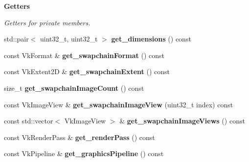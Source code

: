 \begin{Indent}\textbf{ Getters}\par
{\em Getters for private members. }\begin{DoxyCompactItemize}
\item 
\mbox{\label{classblaze_1_1ForwardRenderer_a871a10ee38277a2cb2c0ef9e3d65712f}} 
std\+::pair$<$ uint32\+\_\+t, uint32\+\_\+t $>$ {\bfseries get\+\_\+dimensions} () const
\item 
\mbox{\label{classblaze_1_1ForwardRenderer_ab0c14f3daed7186b1e726f7efd122e7d}} 
const Vk\+Format \& {\bfseries get\+\_\+swapchain\+Format} () const
\item 
\mbox{\label{classblaze_1_1ForwardRenderer_ae4a6f9234ad9454acd3edafec772480e}} 
const Vk\+Extent2D \& {\bfseries get\+\_\+swapchain\+Extent} () const
\item 
\mbox{\label{classblaze_1_1ForwardRenderer_afb27e80c004057dc8aec9652d160e53b}} 
size\+\_\+t {\bfseries get\+\_\+swapchain\+Image\+Count} () const
\item 
\mbox{\label{classblaze_1_1ForwardRenderer_aa442b4f23e7db5f9650802a56bfc37f5}} 
const Vk\+Image\+View \& {\bfseries get\+\_\+swapchain\+Image\+View} (uint32\+\_\+t index) const
\item 
\mbox{\label{classblaze_1_1ForwardRenderer_a3f103d7524870ec1bc7b8a1a9ee9d85f}} 
const std\+::vector$<$ Vk\+Image\+View $>$ \& {\bfseries get\+\_\+swapchain\+Image\+Views} () const
\item 
\mbox{\label{classblaze_1_1ForwardRenderer_ae50e653d1321151a9f9c9809d660958c}} 
const Vk\+Render\+Pass \& {\bfseries get\+\_\+render\+Pass} () const
\item 
\mbox{\label{classblaze_1_1ForwardRenderer_afb5a01c431387ae87f2b69f1a95faa0a}} 
const Vk\+Pipeline \& {\bfseries get\+\_\+graphics\+Pipeline} () const
\item 
\mbox{\label{classblaze_1_1ForwardRenderer_aa13a6c13d0688cafd96aecf19dce466c}} 

\end{DoxyCompactItemize}
\end{Indent}
